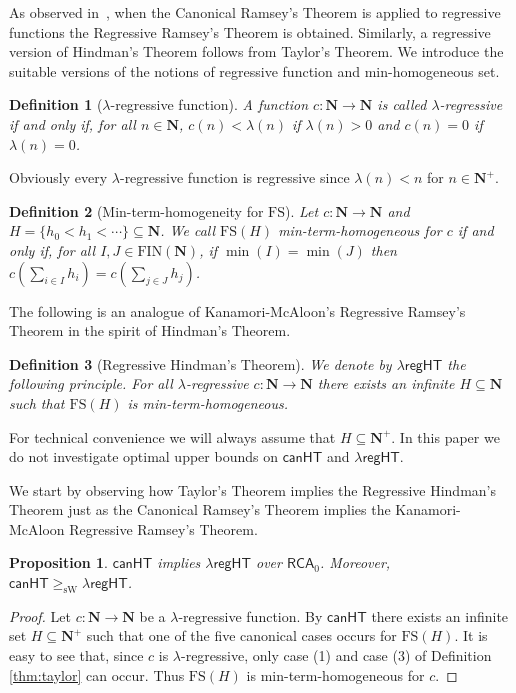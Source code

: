\documentclass[a4paper,11pt]{article}
\newtheorem{definition}{Definition}
\newtheorem{proposition}{Proposition}
\newcommand\Nat{\mathbf{N}}
\newcommand\RCA{\mathsf{RCA}}
\newcommand\regHT{\mathsf{regHT}}
\newcommand\canHT{\mathsf{canHT}}
\newcommand\FIN{\mathrm{FIN}}
\newcommand\FS{\mathrm{FS}}
\newcommand\sW{\mathrm{sW}}
\begin{document}
As observed in~\cite{Kan-McA:87}, when the Canonical Ramsey's Theorem is applied to regressive functions 
the Regressive Ramsey's Theorem is obtained. 
Similarly, a regressive version of Hindman's Theorem follows from Taylor's Theorem.
We introduce the suitable versions of the notions of regressive function and min-homogeneous set. 

\begin{definition}[$\lambda$-regressive function]
A function $c:\Nat\to\Nat$ is called $\lambda$-regressive if and only if, for all $n \in\Nat$, $c(n) < \lambda(n)$
if $\lambda(n)>0$ and $c(n)=0$ if $\lambda(n)=0$.
\end{definition}

Obviously every $\lambda$-regressive function is regressive since $\lambda(n) < n$
for $n\in\Nat^+$. 

\begin{definition}[Min-term-homogeneity for $\FS$]
Let $c:\Nat\to \Nat$ and $H=\{h_0 < h_1 < \cdots\}\subseteq \Nat$. 
We call $\FS(H)$ min-term-homogeneous for $c$
if and only if, 
for all $I, J \in \FIN(\Nat)$, if $\min(I)=\min(J)$ then 
$c(\sum_{i \in I} h_i) = c(\sum_{j\in J} h_j)$.
\end{definition}

The following is an analogue of Kanamori-McAloon's Regressive Ramsey's Theorem in the spirit of Hindman's Theorem.

\begin{definition}[Regressive Hindman's Theorem]
We denote by $\lambda\regHT$ the following principle. For all $\lambda$-regressive $c:\Nat \to \Nat$ 
there exists an infinite
$H\subseteq\Nat$ such that $\FS(H)$ is min-term-homogeneous.
\end{definition}

For technical convenience we will always assume that $H \subseteq \Nat^+$.
In this paper we do not investigate optimal upper bounds on $\canHT$ and $\lambda\regHT$.

We start by observing how Taylor's Theorem implies the Regressive Hindman's Theorem just as the Canonical Ramsey's Theorem implies the Kanamori-McAloon Regressive Ramsey's Theorem. 

\begin{proposition}\label{prop:canHTtoregHTap}
$\canHT$ implies $\lambda\regHT$ over $\RCA_0$. Moreover, $\canHT\geq_\mathrm{\sW} \lambda\regHT$.
\end{proposition}

\begin{proof}
Let $c:\Nat\to \Nat$ be a $\lambda$-regressive function. By $\canHT$ there exists an infinite set $H\subseteq \Nat^+$ such that one of the five canonical cases occurs for $\FS(H)$.
It is easy to see that, since $c$ is $\lambda$-regressive, only case (1) and case (3) of Definition \ref{thm:taylor} can occur. Thus $\FS(H)$ is min-term-homogeneous for $c$.
\end{proof}
\end{document}

